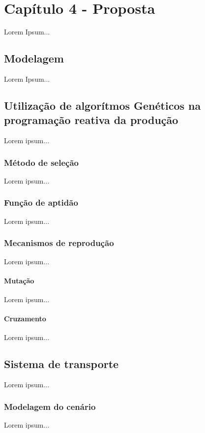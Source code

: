 
\newpage
\section{Capítulo 4 - Proposta}
Lorem Ipsum...

\subsection{Modelagem}
Lorem Ipsum...

\subsection{Utilização de algorítmos Genéticos na programação reativa da produção}
Lorem ipsum...

    \subsubsection{Método de seleção}
    Lorem ipsum...

    \subsubsection{Função de aptidão}
    Lorem ipsum...
    
    \subsubsection{Mecanismos de reprodução}
    Lorem ipsum...
    
        \paragraph{Mutação}
        Lorem ipsum...
        
        \paragraph{Cruzamento}
        Lorem ipsum...
        
\subsection{Sistema de transporte}
Lorem ipsum...

    \subsubsection{Modelagem do cenário}
    Lorem ipsum...
    
